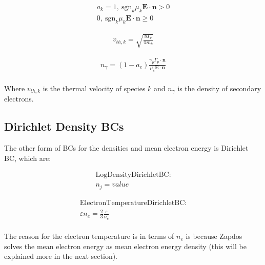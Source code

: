 \documentclass[final]{report}
\begin{document}
  \begin{equation}
  \begin{gathered}
  a_{k} = 1, \ \text{sgn}_{k}\mu_{k}\mathbf{E}\cdot\mathbf{n} > 0 \\
  0, \ \text{sgn}_{k}\mu_{k}\mathbf{E}\cdot\mathbf{n} \geqslant0
  \end{gathered}
  \end{equation}

  \begin{equation}
  \begin{gathered}
    v_{th,k}=\sqrt{\frac{8T_{k}}{\pi m_{k}}}
  \end{gathered}
  \end{equation}

  \begin{equation}
  \begin{gathered}
    n_{\gamma}=(1-a_{e})\frac{\gamma_{p}\Gamma_{p}\cdot\mathbf{n}}{\mu_{e}\mathbf{E}\cdot\mathbf{n}}
  \end{gathered}
  \end{equation}
  \\
  Where $v_{th,k}$ is the thermal velocity of species $k$ and $n_{\gamma}$ is the density of secondary electrons.

  \subsection{Dirichlet Density BCs}

  The other form of BCs for the densities and mean electron energy is Dirichlet BC, which are:

  \begin{equation}
  \begin{gathered}
    \text{LogDensityDirichletBC:} \\
    n_{j}=value
  \end{gathered}
  \end{equation}

  \begin{equation}
  \begin{gathered}
    \text{ElectronTemperatureDirichletBC:} \\
    \varepsilon n_{e} = \frac{2}{3} \frac{\varepsilon}{n_{e}}
  \end{gathered}
  \end{equation}
  \\
  The reason for the electron temperature is in terms of $n_{e}$ is because Zapdos solves the mean electron energy as mean electron energy density (this will be explained more in the next section).
\end{document}

